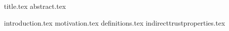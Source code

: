 \documentclass[11pt]{llncs}
\begin{document}
{title.tex}
\thispagestyle{plain}
{abstract.tex}

{introduction.tex}
{motivation.tex}
{definitions.tex}
{indirecttrustproperties.tex}

\end{document}
